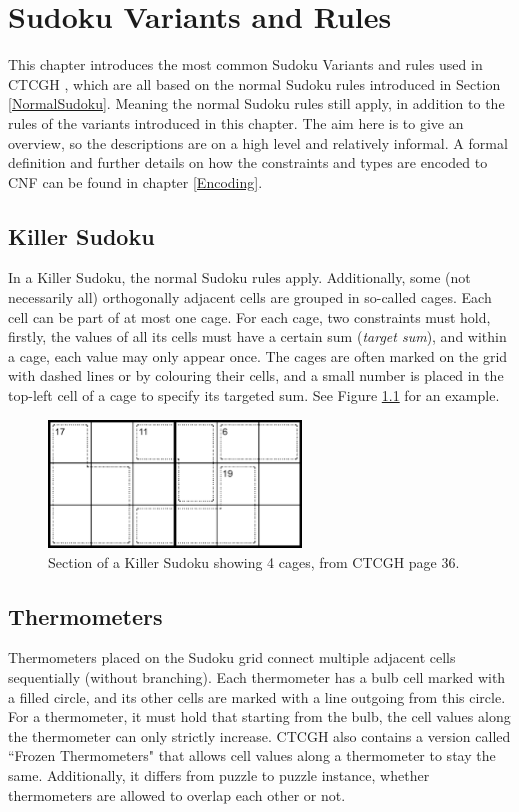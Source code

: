 \chapter{Sudoku Variants and Rules}\label{SudokuVariantsAndRules}
This chapter introduces the most common Sudoku Variants and rules used in CTCGH \cite{CrackingTheCryptic2021}, which are all based on the normal Sudoku rules introduced in Section \ref{NormalSudoku}. Meaning the normal Sudoku rules still apply, in addition to the rules of the variants introduced in this chapter. The aim here is to give an overview, so the descriptions are on a high level and relatively informal. A formal definition and further details on how the constraints and types are encoded to CNF can be found in chapter \ref{Encoding}.

\section{Killer Sudoku}
In a Killer Sudoku, the normal Sudoku rules apply. Additionally, some (not necessarily all) orthogonally adjacent cells are grouped in so-called cages. Each cell can be part of at most one cage. For each cage, two constraints must hold, firstly, the values of all its cells must have a certain sum (\emph{target sum}), and within a cage, each value may only appear once. The cages are often marked on the grid with dashed lines or by colouring their cells, and a small number is placed in the top-left cell of a cage to specify its targeted sum. See Figure \ref{fig:exampleKiller} for an example.

\begin{figure}
\centering
\includegraphics[width=0.6\textwidth]{Figures/Killer Example (CTC page 36).png}
\caption{Section of a Killer Sudoku showing 4 cages, from CTCGH \cite{CrackingTheCryptic2021} page 36.}
\label{fig:exampleKiller}
\end{figure}

\section{Thermometers}
Thermometers placed on the Sudoku grid connect multiple adjacent cells sequentially (without branching). Each thermometer has a bulb cell marked with a filled circle, and its other cells are marked with a line outgoing from this circle. For a thermometer, it must hold that starting from the bulb, the cell values along the thermometer can only strictly increase. CTCGH \cite{CrackingTheCryptic2021} also contains a version called ``Frozen Thermometers" that allows cell values along a thermometer to stay the same. Additionally, it differs from puzzle to puzzle instance, whether thermometers are allowed to overlap each other or not.

